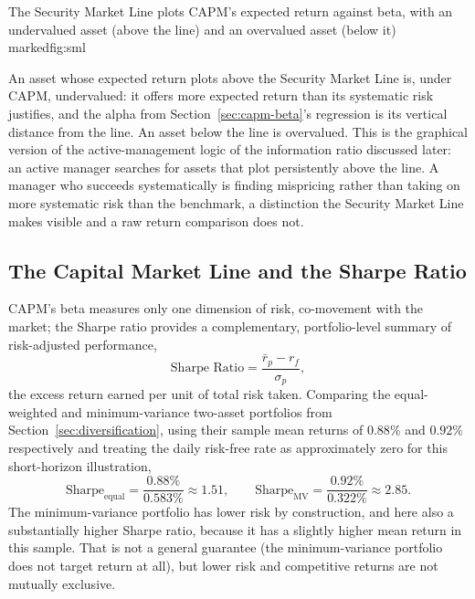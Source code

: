 \documentclass[../ai_in_finance]{subfiles}
\begin{document}
\begin{bookfigure}[htbp]{The Security Market Line plots CAPM's expected return against beta, with an undervalued asset (above the line) and an overvalued asset (below it) marked}{fig:sml}
\end{bookfigure}

An asset whose expected return plots above the Security Market Line is, under CAPM, undervalued: it offers more expected return than its systematic risk justifies, and the alpha from Section~\ref{sec:capm-beta}'s regression is its vertical distance from the line. An asset below the line is overvalued.
This is the graphical version of the active-management logic of the information ratio discussed later: an active manager searches for assets that plot persistently above the line. A manager who succeeds systematically is finding mispricing rather than taking on more systematic risk than the benchmark, a distinction the Security Market Line makes visible and a raw return comparison does not.

\subsection{The Capital Market Line and the Sharpe Ratio}
\label{sec:sharpe-cml}

CAPM's beta measures only one dimension of risk, co-movement with the market; the Sharpe ratio provides a complementary, portfolio-level summary of risk-adjusted performance,
\begin{equation}
\text{Sharpe Ratio} = \frac{\bar r_p - r_f}{\sigma_p},
\label{eq:portfolio-sharpe}
\end{equation}
the excess return earned per unit of total risk taken. Comparing the equal-weighted and minimum-variance two-asset portfolios from Section~\ref{sec:diversification}, using their sample mean returns of $0.88\%$ and $0.92\%$ respectively and treating the daily risk-free rate as approximately zero for this short-horizon illustration,
\begin{equation*}
\text{Sharpe}_{\text{equal}} = \frac{0.88\%}{0.583\%} \approx 1.51, \qquad \text{Sharpe}_{\text{MV}} = \frac{0.92\%}{0.322\%} \approx 2.85.
\end{equation*}
The minimum-variance portfolio has lower risk by construction, and here also a substantially higher Sharpe ratio, because it has a slightly higher mean return in this sample. That is not a general guarantee (the minimum-variance portfolio does not target return at all), but lower risk and competitive returns are not mutually exclusive.
\end{document}

